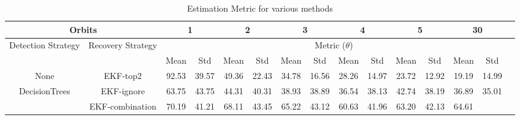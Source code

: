 \begin{table*}[] 
\label{Table: Estimation Metric-Reflection} 
\caption{Estimation Metric for various methods} 
\centering 
\begin{tabular} 
 {@{}ccccccccccccccc@{}} 
\toprule 
\multicolumn{2}{c}{\textbf{Orbits}} & 
\multicolumn{2}{c}{\textbf{1}} & 
\multicolumn{2}{c}{\textbf{2}} & 
\multicolumn{2}{c}{\textbf{3}} & 
\multicolumn{2}{c}{\textbf{4}} & 
\multicolumn{2}{c}{\textbf{5}} & 
\multicolumn{2}{c}{\textbf{30}}
 \\ \midrule 
\multicolumn{1}{|c|}{\multirow{2}{*}{Detection Strategy}} & 
\multicolumn{1}{c|}{\multirow{2}{*}{Recovery Strategy}} & 
\multicolumn{12}{c|}{Metric ($\theta$)}
 \\ \cmidrule(l){3-14} 
\multicolumn{1}{|c|}{} & 
\multicolumn{1}{c|}{} & 
\multicolumn{1}{c|}{Mean} & 
\multicolumn{1}{c|}{Std} & 
\multicolumn{1}{c|}{Mean} & 
\multicolumn{1}{c|}{Std} & 
\multicolumn{1}{c|}{Mean} & 
\multicolumn{1}{c|}{Std} & 
\multicolumn{1}{c|}{Mean} & 
\multicolumn{1}{c|}{Std} & 
\multicolumn{1}{c|}{Mean} & 
\multicolumn{1}{c|}{Std} & 
\multicolumn{1}{c|}{Mean} & 
\multicolumn{1}{c|}{Std}
 \\ \midrule 
\multicolumn{1}{|c|}{None} & 
\multicolumn{1}{c|}{EKF-top2} & 
\multicolumn{1}{c|}{92.53} & 
\multicolumn{1}{c|}{39.57} & 
\multicolumn{1}{c|}{49.36} & 
\multicolumn{1}{c|}{22.43} & 
\multicolumn{1}{c|}{34.78} & 
\multicolumn{1}{c|}{16.56} & 
\multicolumn{1}{c|}{28.26} & 
\multicolumn{1}{c|}{14.97} & 
\multicolumn{1}{c|}{23.72} & 
\multicolumn{1}{c|}{12.92} & 
\multicolumn{1}{c|}{19.19} & 
\multicolumn{1}{c|}{14.99}
 \\ \midrule 
\multicolumn{1}{|c|}{\multirow{3}{*}{DecisionTrees}} & 
\multicolumn{1}{c|}{EKF-ignore} & 
\multicolumn{1}{c|}{63.75} & 
\multicolumn{1}{c|}{43.75} & 
\multicolumn{1}{c|}{44.31} & 
\multicolumn{1}{c|}{40.31} & 
\multicolumn{1}{c|}{38.93} & 
\multicolumn{1}{c|}{38.89} & 
\multicolumn{1}{c|}{36.54} & 
\multicolumn{1}{c|}{38.13} & 
\multicolumn{1}{c|}{42.74} & 
\multicolumn{1}{c|}{38.19} & 
\multicolumn{1}{c|}{36.89} & 
\multicolumn{1}{c|}{35.01}
 \\ \cmidrule(l){2-14} 
\multicolumn{1}{|c|}{} & 
\multicolumn{1}{c|}{EKF-combination} & 
\multicolumn{1}{c|}{70.19} & 
\multicolumn{1}{c|}{41.21} & 
\multicolumn{1}{c|}{68.11} & 
\multicolumn{1}{c|}{43.45} & 
\multicolumn{1}{c|}{65.22} & 
\multicolumn{1}{c|}{43.12} & 
\multicolumn{1}{c|}{60.63} & 
\multicolumn{1}{c|}{41.96} & 
\multicolumn{1}{c|}{63.20} & 
\multicolumn{1}{c|}{42.13} & 
\multicolumn{1}{c|}{64.61} & 

\end{tabular}
\end{table*}
